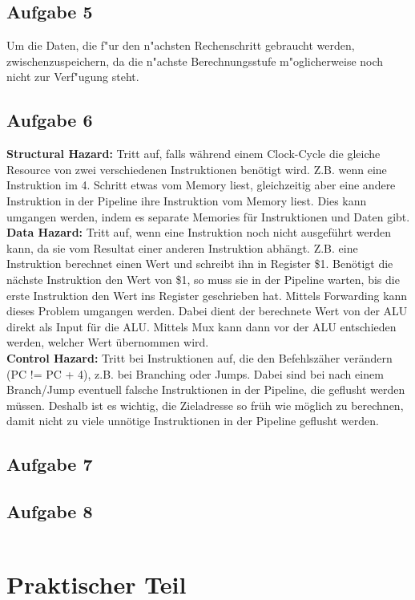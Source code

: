 \documentclass[a4paper,abstracton]{scrartcl}
\begin{document}
\subsection{Aufgabe 5}
Um die Daten, die f"ur den n"achsten Rechenschritt gebraucht werden, zwischenzuspeichern, da die 
n"achste Berechnungsstufe m"oglicherweise noch nicht zur Verf"ugung steht.
\subsection{Aufgabe 6}
\textbf{Structural Hazard:} Tritt auf, falls während einem Clock-Cycle die gleiche Resource von zwei verschiedenen Instruktionen benötigt wird. Z.B. wenn eine Instruktion im 4. Schritt etwas vom Memory liest, gleichzeitig aber eine andere Instruktion in der Pipeline ihre Instruktion vom Memory liest. Dies kann umgangen werden, indem es separate Memories für Instruktionen und Daten gibt.\\
\textbf{Data Hazard:} Tritt auf, wenn eine Instruktion noch nicht ausgeführt werden kann, da sie vom Resultat einer anderen Instruktion abhängt. Z.B. eine Instruktion berechnet einen Wert und schreibt ihn in Register \$1. Benötigt die nächste Instruktion den Wert von \$1, so muss sie in der Pipeline warten, bis die erste Instruktion den Wert ins Register geschrieben hat. Mittels Forwarding kann dieses Problem umgangen werden. Dabei dient der berechnete Wert von der ALU direkt als Input für die ALU. Mittels Mux kann dann vor der ALU entschieden werden, welcher Wert übernommen wird. \\
\textbf{Control Hazard:} Tritt bei Instruktionen auf, die den Befehlszäher verändern (PC != PC + 4), z.B. bei Branching oder Jumps. Dabei sind bei nach einem Branch/Jump eventuell falsche Instruktionen in der Pipeline, die geflusht werden müssen. Deshalb ist es wichtig, die Zieladresse so früh wie möglich zu berechnen, damit nicht zu viele unnötige Instruktionen in der Pipeline geflusht werden.\\
\subsection{Aufgabe 7}

\subsection{Aufgabe 8}
\begin{lstlisting}

\end{lstlisting}

\newpage
\section{Praktischer Teil}

\newpage

\end{document}
